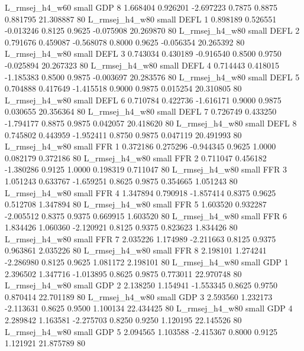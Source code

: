 L_rmsej_h4_w60      small      GDP                 8 1.668404 0.926201 -2.697223 0.7875 0.8875  0.881795   21.308887 80
L_rmsej_h4_w80      small     DEFL                 1 0.898189 0.526551 -0.013246 0.8125 0.9625 -0.075908   20.269870 80
L_rmsej_h4_w80      small     DEFL                 2 0.791676 0.459087 -0.568078 0.8000 0.9625 -0.056354   20.265392 80
L_rmsej_h4_w80      small     DEFL                 3 0.743034 0.430189 -0.916540 0.8500 0.9750 -0.025894   20.267323 80
L_rmsej_h4_w80      small     DEFL                 4 0.714443 0.418015 -1.185383 0.8500 0.9875 -0.003697   20.283576 80
L_rmsej_h4_w80      small     DEFL                 5 0.704888 0.417649 -1.415518 0.9000 0.9875  0.015254   20.310805 80
L_rmsej_h4_w80      small     DEFL                 6 0.710784 0.422736 -1.616171 0.9000 0.9875  0.030655   20.356364 80
L_rmsej_h4_w80      small     DEFL                 7 0.726749 0.433250 -1.794177 0.8875 0.9875  0.042057   20.418620 80
L_rmsej_h4_w80      small     DEFL                 8 0.745802 0.443959 -1.952411 0.8750 0.9875  0.047119   20.491993 80
L_rmsej_h4_w80      small      FFR                 1 0.372186 0.275296 -0.944345 0.9625 1.0000  0.082179    0.372186 80
L_rmsej_h4_w80      small      FFR                 2 0.711047 0.456182 -1.380286 0.9125 1.0000  0.198319    0.711047 80
L_rmsej_h4_w80      small      FFR                 3 1.051243 0.633767 -1.659251 0.8625 0.9875  0.354665    1.051243 80
L_rmsej_h4_w80      small      FFR                 4 1.347894 0.790918 -1.857414 0.8375 0.9625  0.512708    1.347894 80
L_rmsej_h4_w80      small      FFR                 5 1.603520 0.932287 -2.005512 0.8375 0.9375  0.669915    1.603520 80
L_rmsej_h4_w80      small      FFR                 6 1.834426 1.060360 -2.120921 0.8125 0.9375  0.823623    1.834426 80
L_rmsej_h4_w80      small      FFR                 7 2.035226 1.174989 -2.211663 0.8125 0.9375  0.963861    2.035226 80
L_rmsej_h4_w80      small      FFR                 8 2.198101 1.274241 -2.286980 0.8125 0.9625  1.081172    2.198101 80
L_rmsej_h4_w80      small      GDP                 1 2.396502 1.347716 -1.013895 0.8625 0.9875  0.773011   22.970748 80
L_rmsej_h4_w80      small      GDP                 2 2.138250 1.154941 -1.553345 0.8625 0.9750  0.870414   22.701189 80
L_rmsej_h4_w80      small      GDP                 3 2.593560 1.232173 -2.113631 0.8625 0.9500  1.100134   22.434425 80
L_rmsej_h4_w80      small      GDP                 4 2.289842 1.163581 -2.275703 0.8250 0.9250  1.120195   22.145526 80
L_rmsej_h4_w80      small      GDP                 5 2.094565 1.103588 -2.415367 0.8000 0.9125  1.121921   21.875789 80
